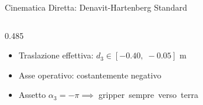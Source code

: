 \documentclass[aspectratio=169, 10pt]{beamer}
\begin{document}
\begin{frame}{Cinematica Diretta: Denavit-Hartenberg Standard}
\begin{columns}[onlytextwidth, T]
        \begin{column}{0.485\textwidth}
            \begin{tcolorbox}[moderncard, title={\color{TechCyan}Escursione Variabile Link 3}, equal height group=dh_bot]
                \footnotesize
                \begin{itemize}
                    \setlength{\itemsep}{1.5pt}
                    \item Traslazione effettiva: $d_3 \in [-0.40, \; -0.05]\text{ m}$
                    \item Asse operativo: costantemente negativo
                    \item Assetto $\alpha_3 = -\pi \implies$ \mbox{gripper sempre verso terra}
                \end{itemize}
            \end{tcolorbox}
        \end{column}
    \end{columns}
\end{frame}
\end{document}
